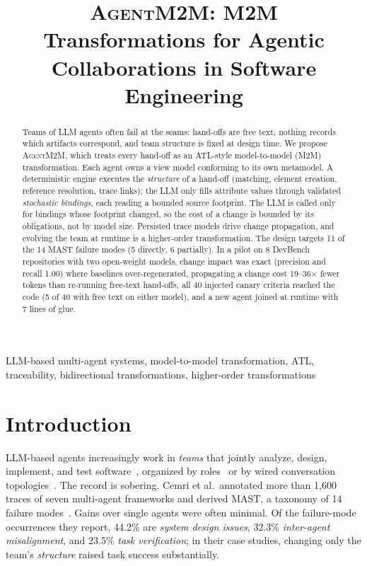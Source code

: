 \documentclass[10pt,conference]{IEEEtran}
\theoremstyle{definition}
\newcommand{\tool}{\textsc{AgentM2M}}
\begin{document}
\title{\textsc{AgentM2M}: M2M Transformations for Agentic Collaborations in Software Engineering}


\maketitle


\begin{abstract}
Teams of LLM agents often fail at the seams: hand-offs are free text,
nothing records which artifacts correspond, and team structure is fixed at
design time. We propose \tool{}, which treats every
hand-off as an ATL-style model-to-model (M2M) transformation. Each agent
owns a view model conforming to its own metamodel. A deterministic engine
executes the \emph{structure} of a hand-off (matching, element creation,
reference resolution, trace links); the LLM only fills attribute values
through validated \emph{stochastic bindings}, each reading a bounded source
footprint. The LLM is called only for bindings whose footprint changed, so
the cost of a change is bounded by its obligations, not by model size.
Persisted trace models drive change propagation, and evolving the team at
runtime is a higher-order transformation. The design targets 11 of the 14
MAST failure modes (5 directly, 6 partially). In a pilot on 8 DevBench
repositories with two open-weight models, change impact was exact
(precision and recall 1.00) where baselines over-regenerated, propagating a
change cost 19--36$\times$ fewer tokens than re-running free-text
hand-offs, all 40 injected canary criteria reached the code (5 of 40 with
free text on either model), and a new agent joined at runtime with 7 lines of glue.
\end{abstract}

\begin{IEEEkeywords}
LLM-based multi-agent systems, model-to-model transformation, ATL,
traceability, bidirectional transformations, higher-order transformations
\end{IEEEkeywords}

\section{Introduction}\label{sec:introduction}

LLM-based agents increasingly work in \emph{teams} that jointly analyze,
design, implement, and test software~\cite{he2025lma}, organized by
roles~\cite{hong2024metagpt,qian2024chatdev,tao2024magis} or by wired
conversation topologies~\cite{wu2024autogen,li2023camel,chen2024agentverse}.
The record is sobering. Cemri et al.\ annotated more than 1{,}600
traces of seven multi-agent frameworks and derived MAST, a taxonomy of 14
failure modes~\cite{cemri2025mast}. Gains over single agents were often
minimal. Of the failure-mode occurrences they report, 44.2\% are
\emph{system design issues}, 32.3\% \emph{inter-agent misalignment}, and
23.5\% \emph{task verification}; in their case studies, changing only the
team's \emph{structure} raised task success substantially.
\end{document}
